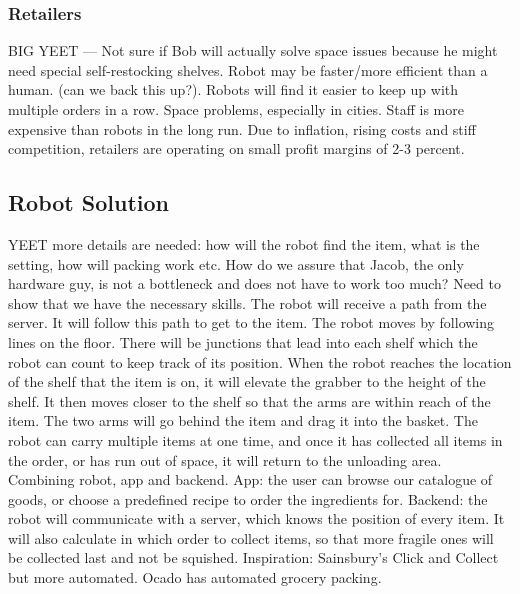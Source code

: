 \documentclass[12pt]{article}
\begin{document}
\subsubsection*{Retailers} 
BIG YEET --- Not sure if Bob will actually solve space issues because he might need special self-restocking shelves.
Robot may be faster/more efficient than a human. (can we back this up?). Robots will find it easier to keep up with multiple orders in a row.
\newline\newline
Space problems, especially in cities. Staff is more expensive than robots in the long run. Due to inflation, rising costs and stiff competition, retailers are operating on small profit margins of 2-3 percent. \cite{ho_2017}


\subsection*{Robot Solution}
YEET more details are needed: how will the robot find the item, what is the setting, how will packing work etc. How do we assure that Jacob, the only hardware guy, is not a bottleneck and does not have to work too much? Need to show that we have the necessary skills.
\newline\newline
The robot will receive a path from the server.
It will follow this path to get to the item.
The robot moves by following lines on the floor. There will be junctions that lead into each shelf which the robot can count to keep track of its position.
\newline\newline
When the robot reaches the location of the shelf that the item is on, it will elevate the grabber to the height of the shelf.
It then moves closer to the shelf so that the arms are within reach of the item.
\newline\newline
The two arms will go behind the item and drag it into the basket.
The robot can carry multiple items at one time, and once it has collected all items in the order, or has run out of space, it will return to the unloading area.
\newline\newline
Combining robot, app and backend.
\newline
App: the user can browse our catalogue of goods, or choose a predefined recipe to order the ingredients for.
\newline
Backend: the robot will communicate with a server, which knows the position of every item. It will also calculate in which order to collect items, so that more fragile ones will be collected last and not be squished.
\newline
Inspiration: Sainsbury's Click and Collect but more automated.
\newline
Ocado has automated grocery packing.
\end{document}
